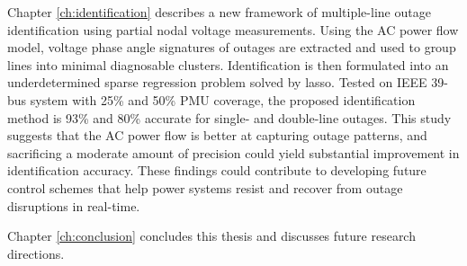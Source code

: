 Chapter \ref{ch:identification} describes a new framework of multiple-line outage identification using partial nodal voltage measurements. Using the AC power flow model, voltage phase angle signatures of outages are extracted and used to group lines into minimal diagnosable clusters. Identification is then formulated into an underdetermined sparse regression problem solved by lasso. Tested on IEEE 39-bus system with 25\% and 50\% PMU coverage, the proposed identification method is 93\% and 80\% accurate for single- and double-line outages. 
This study suggests that the AC power flow is better at capturing outage patterns, and sacrificing a moderate amount of precision could yield substantial improvement in identification accuracy. These findings could contribute to developing future control schemes that help power systems resist and recover from outage disruptions in real-time.


Chapter \ref{ch:conclusion} concludes this thesis and discusses future research directions.
